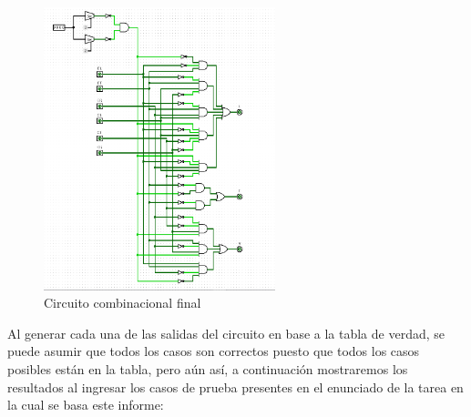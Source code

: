 \documentclass[a4paper]{article}
\begin{document}
\begin{figure}[!htbp]
    \centering
    \includegraphics[width=0.6\textwidth]{circuito_final.png}
    \caption{Circuito combinacional final}
    \label{fig:CircFinal}
\end{figure}

Al generar cada una de las salidas del circuito en base a la tabla de verdad, se puede asumir que todos los casos son correctos puesto que todos los casos posibles están en la tabla, pero aún así, a continuación mostraremos los resultados al ingresar los casos de prueba presentes en el enunciado de la tarea en la cual se basa este informe:
\end{document}
